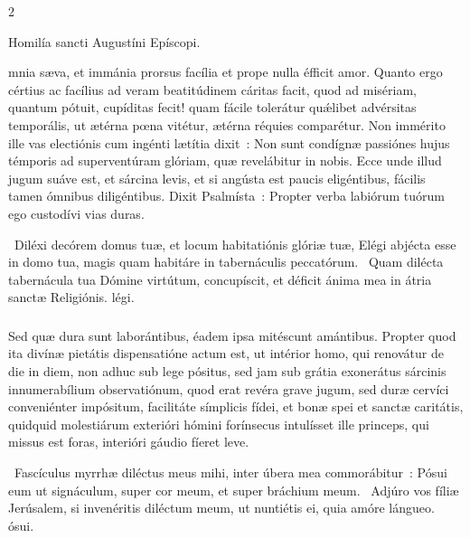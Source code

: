 \documentclass[9pt,twoside]{extarticle}
\begin{document}
\begin{multicols}{2}
{\begin{center}Homilía sancti Augustíni Epíscopi.\\
\end{center}
mnia sæva, et immánia prorsus facília et prope nulla éfficit amor. Quanto ergo cértius ac facílius ad veram beatitúdinem cáritas facit, quod ad misériam, quantum pótuit, cupíditas fecit! quam fácile tolerátur quǽlibet advérsitas temporális, ut ætérna pœna vitétur, ætérna réquies comparétur. Non immérito ille vas electiónis cum ingénti lætítia dixit~: Non sunt condígnæ passiónes hujus témporis ad superventúram glóriam, quæ revelábitur in nobis. Ecce unde illud jugum suáve est, et sárcina levis, et si angústa est paucis eligéntibus, fácilis tamen ómnibus diligéntibus. Dixit Psalmísta~: Propter verba labiórum tuórum ego custodívi vias duras.

\begin{tightlist}{}
\item {}~Diléxi decórem domus tuæ, et locum habitatiónis glóriæ tuæ, \textred{*} Elégi abjécta esse in domo tua, magis quam habitáre in tabernáculis peccatórum. ~Quam dilécta tabernácula tua Dómine virtútum, concupíscit, et déficit ánima mea in átria sanctæ Religiónis. légi.
\end{tightlist}

\subsubsection*{\center {}}
Sed quæ dura sunt laborántibus, éadem ipsa mitéscunt amántibus. Propter quod ita divínæ pietátis dispensatióne actum est, ut intérior homo, qui renovátur de die in diem, non adhuc sub lege pósitus, sed jam sub grátia exonerátus sárcinis innumerabílium observatiónum, quod erat revéra grave jugum, sed duræ cervíci conveniénter impósitum, facilitáte símplicis fídei, et bonæ spei et sanctæ caritátis, quidquid molestiárum exterióri hómini forínsecus intulísset ille princeps, qui missus est foras, interióri gáudio fíeret leve.

\begin{tightlist}{}
\item {}~Fascículus myrrhæ diléctus meus mihi, inter úbera mea commorábitur~: \textred{*} Pósui eum ut signáculum, super cor meum, et super bráchium meum. ~Adjúro vos fíliæ Jerúsalem, si invenéritis diléctum meum, ut nuntiétis ei, quia amóre lángueo. ósui.
\end{tightlist}

}
\end{multicols}
\end{document}
